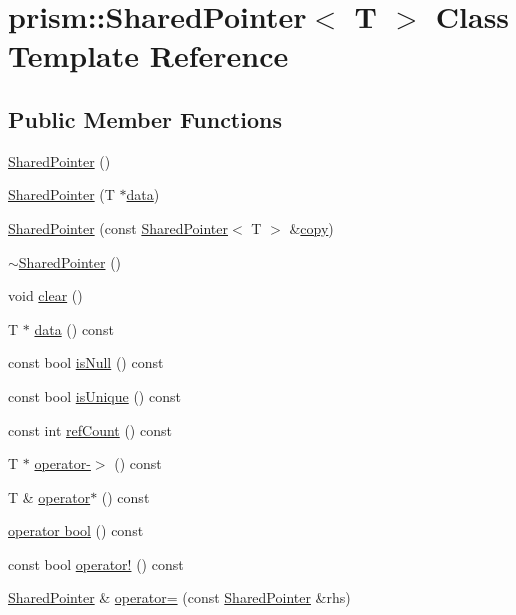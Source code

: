 \hypertarget{classprism_1_1_shared_pointer}{}\section{prism\+:\+:Shared\+Pointer$<$ T $>$ Class Template Reference}
\label{classprism_1_1_shared_pointer}
\subsection*{Public Member Functions}
\begin{DoxyCompactItemize}
\item 
\hyperlink{classprism_1_1_shared_pointer_a076711618f299e5a5d04261d7d806aff}{Shared\+Pointer} ()
\item 
\hyperlink{classprism_1_1_shared_pointer_a0b8d1327178383b39bd6bb2826d384b4}{Shared\+Pointer} (T $\ast$\hyperlink{classprism_1_1_shared_pointer_aecf5f8614d4c5683e6c0207436ed8900}{data})
\item 
\hyperlink{classprism_1_1_shared_pointer_a7346c06b6c0e7c80236472c4d085460c}{Shared\+Pointer} (const \hyperlink{classprism_1_1_shared_pointer}{Shared\+Pointer}$<$ T $>$ \&\hyperlink{namespaceprism_ae776f4cd825f79e7af1cf6ee1d90a209}{copy})
\item 
\hyperlink{classprism_1_1_shared_pointer_a9892f1a766b66491af8a7356cb574ac3}{$\sim$\+Shared\+Pointer} ()
\item 
void \hyperlink{classprism_1_1_shared_pointer_a70f571a23e5c800d43f309cea9857360}{clear} ()
\item 
T $\ast$ \hyperlink{classprism_1_1_shared_pointer_aecf5f8614d4c5683e6c0207436ed8900}{data} () const 
\item 
const bool \hyperlink{classprism_1_1_shared_pointer_a011b5c5b151717cfcc45bce7eb969254}{is\+Null} () const 
\item 
const bool \hyperlink{classprism_1_1_shared_pointer_ad0eef18b3e5c37274f22cff8b88f7d66}{is\+Unique} () const 
\item 
const int \hyperlink{classprism_1_1_shared_pointer_a6b122ff924644d334ae0ff9f184af047}{ref\+Count} () const 
\item 
T $\ast$ \hyperlink{classprism_1_1_shared_pointer_a46555958394709490c4e7378c7bd2a39}{operator-\/$>$} () const 
\item 
T \& \hyperlink{classprism_1_1_shared_pointer_aef4f7418cd76f2a7b0cb20ad83e44720}{operator$\ast$} () const 
\item 
\hyperlink{classprism_1_1_shared_pointer_a1d05fe8cac7da2ea12fc321c45f59391}{operator bool} () const 
\item 
const bool \hyperlink{classprism_1_1_shared_pointer_a6a9e94b71b5ead6c0edbc836e3babb74}{operator!} () const 
\item 
\hyperlink{classprism_1_1_shared_pointer}{Shared\+Pointer} \& \hyperlink{classprism_1_1_shared_pointer_a1cc6ec5d911e2f86c2bfe07be115cd1e}{operator=} (const \hyperlink{classprism_1_1_shared_pointer}{Shared\+Pointer} \&rhs)
\end{DoxyCompactItemize}
